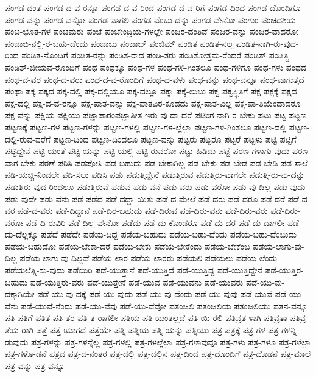 {ಪಂಗಡ-ದಂತೆ
ಪಂಗಡ-ದ-ವ-ರನ್ನೂ
ಪಂಗಡ-ದ-ವ-ರಿಂದ
ಪಂಗಡ-ದ-ವ-ರಿಗೆ
ಪಂಗಡ-ದಿಂದ
ಪಂಗಡ-ದೊಂದಿಗೂ
ಪಂಗಡ-ವನ್ನು
ಪಂಗಡ-ವನ್ನೋ
ಪಂಗಡ-ವಾಗಲಿ
ಪಂಗಡ-ವೆಂಬು-ದನ್ನು
ಪಂಗಡ-ವೇನೋ
ಪಂಗುಂ
ಪಂಚದಶಿಯ
ಪಂಚ-ಭೂತ-ಗಳ
ಪಂಚಮರು
ಪಂಚೆ
ಪಂಚೇಂದ್ರಿಯ-ಗಳಲ್ಲೇ
ಪಂಜರ-ದಂತಿವೆ
ಪಂಜರ-ವನ್ನು
ಪಂಜರ-ವಾದರೋ
ಪಂಜಾಬಿ-ನಲ್ಲಿ-ರ-ಬಹು-ದೆಂದು
ಪಂಜಾಬು
ಪಂಜಾಬ್
ಪಂಜಿಮ್
ಪಂಡಿತ
ಪಂಡಿತ-ನಲ್ಲ
ಪಂಡಿತ-ನಾಗಿ-ರು-ವುದ-ರಿಂದ
ಪಂಡಿತ-ನೊಂದಿಗೆ
ಪಂಡಿತ-ರನ್ನು
ಪಂಡಿತ-ರಾದ
ಪಂಡಿ-ತರು
ಪಂಡಿತೋತ್ತಮ-ರೆಂದರೆ
ಪಂಡಿತ್
ಪಂಡಿತ್ಜಿ
ಪಂಡಿತ್-ಜೀಯವ-ರೊಂದಿಗೆ
ಪಂಥ
ಪಂಥಕ್ಕೂ
ಪಂಥ-ಗಳ
ಪಂಥ-ಗಳಿ-ಗಿಂತಲೂ
ಪಂಥ-ಗಳಿಗೂ
ಪಂಥ-ಗಳು
ಪಂಥದ
ಪಂಥ-ದ-ವರ
ಪಂಥ-ದ-ವರು
ಪಂಥ-ದ-ವ-ರೊಂದಿಗೆ
ಪಂಥ-ದ-ವಳು
ಪಂಥ-ವನ್ನು
ಪಂಥ-ವನ್ನೂ
ಪಂಥ-ವಾಗುತ್ತದೆ
ಪಂಥಾ
ಪಕ್ಕ
ಪಕ್ಕದ
ಪಕ್ಕ-ದಲ್ಲಿ
ಪಕ್ಕ-ದಲ್ಲಿಯೂ
ಪಕ್ಕ-ದಲ್ಲೂ
ಪಕ್ಕಾ
ಪಕ್ಕೆ-ಲುಬು
ಪಕ್ವ
ಪಕ್ವಸ್ಥಿತಿಗೆ
ಪಕ್ಷ
ಪಕ್ಷಕ್ಕೆ
ಪಕ್ಷದ
ಪಕ್ಷ-ದಲ್ಲಿ
ಪಕ್ಷ-ದ-ವ-ರನ್ನೂ
ಪಕ್ಷ-ಪಾತ-ವನ್ನು
ಪಕ್ಷ-ಪಾತವಿರ-ಕೂಡದು
ಪಕ್ಷ-ಪಾತ-ವಿಲ್ಲ
ಪಕ್ಷ-ಪಾ-ತಿಯೆಂದಾದರೂ
ಪಕ್ಷ-ವನ್ನು
ಪಕ್ಷಿಯ
ಪಕ್ಷಿಯು
ಪಜ್ಞಾಪಾರಂಪಜ್ಞಾತೀತ-ಇರು-ವು-ದಾ-ದರೆ
ಪಟಿಂಗ-ನಾಗಿ-ರ-ಬೇಕು
ಪಟು
ಪಟ್ಟ
ಪಟ್ಟಣ
ಪಟ್ಟಣಕ್ಕೆ
ಪಟ್ಟಣ-ಗಳ
ಪಟ್ಟಣ-ಗಳನ್ನು
ಪಟ್ಟಣ-ಗಳಲ್ಲಿ
ಪಟ್ಟಣ-ಗಳ-ಲ್ಲೆಲ್ಲಾ
ಪಟ್ಟಣ-ಗಳಿ-ಗಿಂತಲೂ
ಪಟ್ಟಣ-ದಲ್ಲಿ
ಪಟ್ಟಣ-ದಲ್ಲಿ-ರುವ-ವರೆಗೆ
ಪಟ್ಟಣ-ದಿಂದ
ಪಟ್ಟಣ-ದಿಂದಲೂ
ಪಟ್ಟಣ-ವನ್ನು
ಪಟ್ಟರು
ಪಟ್ಟರೂ
ಪಟ್ಟರೆ
ಪಟ್ಟಳು
ಪಟ್ಟಿ
ಪಟ್ಟಿಗೆ
ಪಟ್ಟಿದ್ದೇನೆ
ಪಟ್ಟಿ-ಯಂತೆ
ಪಟ್ಟಿ-ಯನ್ನು
ಪಟ್ಟಿ-ಯಲ್ಲಿ
ಪಟ್ಟಿ-ರುವರೋ
ಪಟ್ಟು-ಹಿಡಿದು
ಪಟ್ಟೆ
ಪಠಣ-ಗಳಾಗು-ವುದು
ಪಠಣ-ವಾಗ-ಬೇಕು
ಪಠಣೆ
ಪಠಿಸಿ
ಪಡಪೋಸಿ
ಪಡ-ಬಹುದು
ಪಡ-ಬೇಕಾಗಿಲ್ಲ
ಪಡ-ಬೇಕು
ಪಡ-ಬೇಡ
ಪಡ-ಬೇಡಿ
ಪಡ-ಸಾಲೆ
ಪಡಿ-ಯಚ್ಚಿ-ನಿಂದಲೇ
ಪಡಿ-ಸಲು
ಪಡಿಸಿ
ಪಡು
ಪಡುತ್ತಿದ್ದೇನೆ
ಪಡುತ್ತಿರುವ
ಪಡುತ್ತಿರು-ವಾಗಲೇ
ಪಡುತ್ತಿ-ರು-ವು-ದನ್ನು
ಪಡುತ್ತಿರು-ವುದ-ರಿಂದಲೂ
ಪಡುತ್ತಿರುವೆ
ಪಡುವ
ಪಡು-ವನೆ
ಪಡು-ವರು
ಪಡು-ವರೋ
ಪಡು-ವು-ದಿಲ್ಲ
ಪಡು-ವುದು
ಪಡು-ವುದೇ
ಪಡು-ವೆನು
ಪಡೆ
ಪಡೆದ
ಪಡೆ-ದದ್ದಾ-ಯಿತು
ಪಡೆ-ದ-ಮೇಲೆ
ಪಡೆ-ದರು
ಪಡೆ-ದರೂ
ಪಡೆ-ದರೆ
ಪಡೆ-ದ-ವರ
ಪಡೆ-ದ-ವರು
ಪಡೆ-ದಿದ್ದಾನೆ
ಪಡೆ-ದಿರ-ಬಹುದು
ಪಡೆ-ದಿರುವ
ಪಡೆ-ದಿರು-ವನು
ಪಡೆ-ದಿರು-ವರು
ಪಡೆ-ದಿರು-ವರೋ
ಪಡೆ-ದಿ-ರುವಿರಿ
ಪಡೆ-ದಿಲ್ಲ-ವೇನೋ
ಪಡೆದು
ಪಡೆ-ದು-ಕೊಂಡರೂ
ಪಡೆ-ದು-ದರ
ಪಡೆ-ದು-ದಾಗಲೀ
ಪಡೆ-ದು-ದೆಲ್ಲಕ್ಕೂ
ಪಡೆದೆ
ಪಡೆದೇ
ಪಡೆಯ-ದಿದ್ದ
ಪಡೆಯ-ಬಹುದು
ಪಡೆಯ-ಬಹು-ದೆಂದು
ಪಡೆಯ-ಬಹು-ದೆಂಬುದು
ಪಡೆಯ-ಬಹುದೋ
ಪಡೆಯ-ಬೇಕಾ-ದರೆ
ಪಡೆಯ-ಬೇಕು
ಪಡೆಯ-ಬೇಕೆಂದು
ಪಡೆಯ-ಬೇಕೆಂಬ
ಪಡೆಯ-ಲಾಗು-ವು-ದಿಲ್ಲ
ಪಡೆಯ-ಲಾಗು-ವು-ದಿಲ್ಲವೆ
ಪಡೆಯ-ಲಾರ
ಪಡೆಯ-ಲಾರರು
ಪಡೆಯಲಿ
ಪಡೆಯಲು
ಪಡೆಯ-ಲೆಂದು
ಪಡೆಯಲೆತ್ನಿ-ಸು-ವುದು
ಪಡೆಯಿರಿ
ಪಡೆ-ಯುತ್ತಾನೆ
ಪಡೆ-ಯುತ್ತಿದೆ
ಪಡೆ-ಯುತ್ತಿದ್ದ
ಪಡೆ-ಯುತ್ತಿದ್ದೇನೆ
ಪಡೆ-ಯುತ್ತಿರ-ಬಹುದು
ಪಡೆ-ಯುತ್ತಿರು-ವರು
ಪಡೆ-ಯುತ್ತೇನೆ
ಪಡೆ-ಯುವ
ಪಡೆ-ಯುವನು
ಪಡೆ-ಯುವರು
ಪಡೆ-ಯು-ವು-ದಕ್ಕಾಗಿಯೇ
ಪಡೆ-ಯು-ವು-ದಕ್ಕೆ
ಪಡೆ-ಯು-ವುದು
ಪಡೆ-ಯು-ವು-ದೆಂದು
ಪಡೆ-ಯು-ವುವು
ಪಡೆ-ಯುವೆ
ಪಡೆ-ಯು-ವೆನು
ಪಡೆ-ಯುವೆ-ನೆಂದು
ಪಡೆ-ಯು-ವೆವು
ಪಡೆ-ಯು-ವೆವೋ
ಪತಂಜಲಿ
ಪತಂಜಲಿಯ
ಪತಂಜಲಿಯು
ಪತನ-ವನ್ನೂ
ಪತಿ
ಪತಿಗೆ
ಪತಿತ
ಪತಿ-ತರ
ಪತಿ-ತ-ರಾಗಲೀ
ಪತಿಯ
ಪತಿ-ಯಂತಲ್ಲದೆ
ಪತಿ-ಯಿ-ರಲಿ
ಪತಿವ್ರತ-ಳಾಗಿ
ಪತಿವ್ರತಾ
ಪತಿವ್ರ-ತೆಯ-ರಾಗಿ
ಪತ್ತೆ
ಪತ್ತೆ-ಯಾಗದೆ
ಪತ್ತೆಯೇ
ಪತ್ನಿ
ಪತ್ನಿಯ
ಪತ್ನಿ-ಯನ್ನು
ಪತ್ನಿಯು
ಪತ್ರ
ಪತ್ರಕ್ಕೆ
ಪತ್ರ-ಗಳ
ಪತ್ರ-ಗಳನ್ನಿ-ಡುವುದು
ಪತ್ರ-ಗಳನ್ನು
ಪತ್ರ-ಗಳನ್ನೆಲ್ಲ
ಪತ್ರ-ಗಳಲ್ಲಿ
ಪತ್ರ-ಗಳಲ್ಲೆಲ್ಲಾ
ಪತ್ರ-ಗಳಾವುವೂ
ಪತ್ರ-ಗಳು
ಪತ್ರ-ಗಳೂ
ಪತ್ರ-ಗಳೆಲ್ಲಾ
ಪತ್ರ-ಗಳೊ-ಡನೆ
ಪತ್ರದ
ಪತ್ರ-ದ-ನಂತರ
ಪತ್ರ-ದಲ್ಲಿ
ಪತ್ರ-ದಲ್ಲಿನ
ಪತ್ರ-ದಿಂದ
ಪತ್ರ-ದೊಂದಿಗೆ
ಪತ್ರ-ದೊಡನೆ
ಪತ್ರ-ಮಾಲೆ
ಪತ್ರ-ವನ್ನು
ಪತ್ರ-ವನ್ನೂ
}
